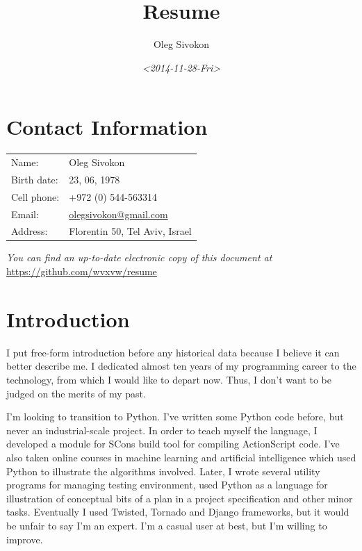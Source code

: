 \documentclass[oneside]{memoir}
\author{Oleg Sivokon}
\date{\textit{<2014-11-28-Fri>}}
\title{Resume}
\begin{document}
\maketitle

\setlength{\parskip}{16pt plus 2pt minus 2pt}

\setcounter{tocdepth}{2}
\tableofcontents

\frontmatter

\chapter{Contact Information}
\label{sec-1}
\begin{center}
\begin{tabular}{ll}
Name: & Oleg Sivokon\\
Birth date: & 23, 06, 1978\\
Cell phone: & +972 (0) 544-563314\\
Email: & \href{mailto:olegsivokon@gmail.com}{olegsivokon@gmail.com}\\
Address: & Florentin 50, Tel Aviv, Israel\\
\end{tabular}
\end{center}

\emph{You can find an up-to-date electronic copy of this document at}
\url{https://github.com/wvxvw/resume}
\chapter{Introduction}
\label{sec-2}
I put free-form introduction before any historical data because I believe it
can better describe me.  I dedicated almost ten years of my programming career
to the technology, from which I would like to depart now.  Thus, I don't want
to be judged on the merits of my past.

I'm looking to transition to Python.  I've written some Python code before,
but never an industrial-scale project.  In order to teach myself the language,
I developed a module for SCons build tool for compiling ActionScript code.
I've also taken online courses in machine learning and artificial intelligence
which used Python to illustrate the algorithms involved.  Later, I wrote
several utility programs for managing testing environment, used Python as a
language for illustration of conceptual bits of a plan in a project
specification and other minor tasks.  Eventually I used Twisted, Tornado and
Django frameworks, but it would be unfair to say I'm an expert.  I'm a casual
user at best, but I'm willing to improve.
\end{document}
